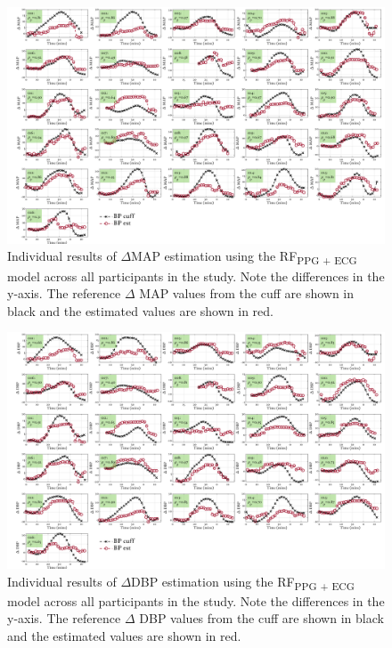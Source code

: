 \documentclass[fleqn,10pt]{wlscirep}
\begin{document}
\begin{figure}[h!]
	\centering
	\includegraphics[width = \textwidth]{Individual_results_MAP.png}
	\caption{Individual results of $\Delta$MAP estimation using the RF\textsubscript{PPG + ECG} model across all participants in the study. Note the differences in the y-axis. The reference $\Delta$ MAP values from the cuff are shown in black and the estimated values are shown in red.}
	\label{fig:Individual_results_MAP}
\end{figure}



\begin{figure}[h!]
	\centering
	\includegraphics[width = \textwidth]{Individual_results_DBP.png}
	\caption{Individual results of $\Delta$DBP estimation using the RF\textsubscript{PPG + ECG} model across all participants in the study. Note the differences in the y-axis. The reference $\Delta$ DBP values from the cuff are shown in black and the estimated values are shown in red.}
	\label{fig:Individual_results_DBP}
\end{figure}
\end{document}
